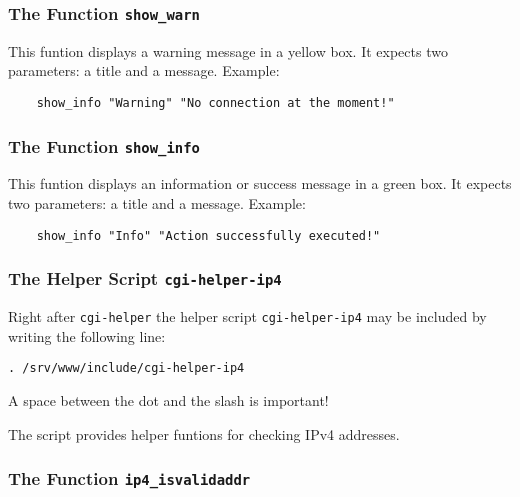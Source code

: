 \subsubsection{The Function \texttt{show\_warn}}

This funtion displays a warning message in a yellow box. It expects two
parameters: a title and a message. Example:

\begin{example}
\begin{verbatim}
    show_info "Warning" "No connection at the moment!"
\end{verbatim}
\end{example}

\subsubsection{The Function \texttt{show\_info}}

This funtion displays an information or success message in a green box. It expects two
parameters: a title and a message. Example:

\begin{example}
\begin{verbatim}
    show_info "Info" "Action successfully executed!"
\end{verbatim}
\end{example}

\subsubsection{The Helper Script \texttt{cgi-helper-ip4}}

Right after \texttt{cgi-helper} the helper script \texttt{cgi-helper-ip4}
may be included by writing the following line:

\begin{example}
\begin{verbatim}
. /srv/www/include/cgi-helper-ip4
\end{verbatim}
\end{example}

A space between the dot and the slash is important!

The script provides helper funtions for checking IPv4 addresses.

\subsubsection{The Function \texttt{ip4\_isvalidaddr}}

